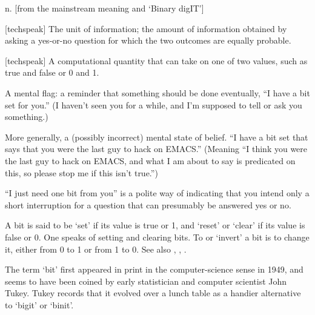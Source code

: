  n.
[from the mainstream meaning and `Binary digIT']
\begin{inparaenum}
    \item {[}techspeak] The unit of information; the amount of information
        obtained by asking a yes-or-no question for which the two outcomes are
        equally probable.
    \item {[}techspeak] A computational quantity that can take on one of two
        values, such as true and false or 0 and 1.
    \item A mental flag: a reminder that something should be done eventually,
        ``I have a bit set for you.'' (I haven't seen you for a while, and I'm
        supposed to tell or ask you something.)
    \item More generally, a (possibly incorrect) mental state of belief. ``I
        have a bit set that says that you were the last guy to hack on EMACS.''
        (Meaning ``I think you were the last guy to hack on EMACS, and what I am
        about to say is predicated on this, so please stop me if this isn't
        true.'')
\end{inparaenum}

``I just need one bit from you'' is a polite way of indicating that you intend
only a short interruption for a question that can presumably be answered yes or
no.

A bit is said to be `set' if its value is true or 1, and `reset' or `clear' if
its value is false or 0. One speaks of setting and clearing bits. To
 or `invert' a bit is to change it, either from 0 to 1 or from
1 to 0. See also , , .

The term `bit' first appeared in print in the computer-science sense in 1949,
and seems to have been coined by early statistician and computer scientist John
Tukey. Tukey records that it evolved over a lunch table as a handier alternative
to `bigit' or `binit'.

